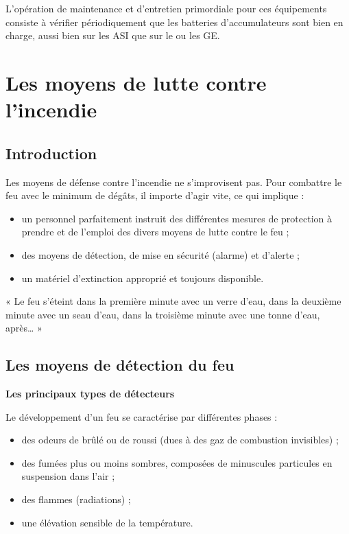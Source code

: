 L’opération de maintenance et d’entretien primordiale pour ces équipements consiste à vérifier périodiquement que les batteries d’accumulateurs sont bien en charge, aussi bien sur les ASI que sur le ou les GE.



\section{Les moyens de lutte contre l’incendie}


\subsection{Introduction}

Les moyens de défense contre l’incendie ne s’improvisent pas. Pour combattre le feu avec le minimum de dégâts, il importe d’agir vite, ce qui implique :
\begin{itemize}

\item  un personnel parfaitement instruit des différentes mesures de protection à prendre et de l’emploi des divers moyens de lutte contre le feu ;
\item  des moyens de détection, de mise en sécurité (alarme) et d’alerte ;
\item  un matériel d’extinction approprié et toujours disponible.

\end{itemize}

« Le feu s’éteint dans la première minute avec un verre d’eau, 
dans la deuxième minute avec un seau d’eau, 
dans la troisième minute avec une tonne d’eau, 
après… »


\subsection{Les moyens de détection du feu}


\textbf{Les principaux types de détecteurs}
\vspace{0.3cm}


Le développement d’un feu se caractérise par différentes phases :
\begin{itemize}

\item  des odeurs de brûlé ou de roussi (dues à des gaz de combustion invisibles) ;
\item  des fumées plus ou moins sombres, composées de minuscules particules en suspension dans l’air ;
\item  des flammes (radiations) ;
\item  une élévation sensible de la température.

\end{itemize}

